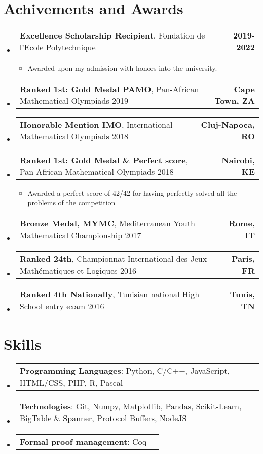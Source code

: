 \documentclass[letterpaper,11pt]{article}
\makeatletter
\newcommand{\resumeItem}[2]{
  \item\small{
    \textbf{#1}{#2 \vspace{-2pt}}
  }
}
\newcommand{\resumePoint}[2]{
  \item
    \begin{tabular*}{0.97\textwidth}[t]{l@{\extracolsep{\fill}}r}
      #1 & \textbf{\small #2}
    \end{tabular*}
}
\newcommand{\resumeSubHeadingListStart}{\begin{itemize}[leftmargin=*]}
\newcommand{\resumeSubHeadingListEnd}{\end{itemize}}
\newcommand{\resumeItemListStart}{\begin{itemize}}
\newcommand{\resumeItemListEnd}{\end{itemize}\vspace{-5pt}}
\makeatother
\begin{document}
\section{Achivements and Awards}
  \resumeSubHeadingListStart
    \resumePoint
      {\textbf{Excellence Scholarship Recipient}, Fondation de l'Ecole Polytechnique}{2019-2022}
      \vspace{-0.6cm}\resumeItemListStart
        \resumeItem{}{Awarded upon my admission with honors into the university.}
      \resumeItemListEnd
    \resumePoint
      {\textbf{Ranked 1st: Gold Medal PAMO}, Pan-African Mathematical Olympiads 2019}{Cape Town, ZA}
      \vspace{-0.6cm}\resumeItemListStart
      \resumeItemListEnd
   \resumePoint
      {\textbf{Honorable Mention IMO}, International Mathematical Olympiads 2018}{Cluj-Napoca, RO}
      \vspace{-0.6cm}\resumeItemListStart
      \resumeItemListEnd
    \resumePoint
      {\textbf{Ranked 1st: Gold Medal \& Perfect score}, Pan-African Mathematical Olympiads 2018}{Nairobi, KE}
      \vspace{-0.6cm}\resumeItemListStart
        \resumeItem{}{Awarded a perfect score of 42/42 for having perfectly solved all the problems of the competition}
      \resumeItemListEnd
    \resumePoint
      {\textbf{Bronze Medal, MYMC}, Mediterranean Youth Mathematical Championship 2017}{Rome, IT}
      \vspace{-0.6cm}\resumeItemListStart
      \resumeItemListEnd
    \resumePoint
      {\textbf{Ranked 24th}, Championnat International des Jeux Mathématiques et Logiques 2016}{Paris, FR}
      \vspace{-0.6cm}\resumeItemListStart
      \resumeItemListEnd
    \resumePoint
      {\textbf{Ranked 4th Nationally}, Tunisian national High School entry exam 2016}{Tunis, TN}
      \vspace{-0.6cm}\resumeItemListStart
      \resumeItemListEnd

  \resumeSubHeadingListEnd

 \section{Skills}
  \resumeSubHeadingListStart
    \resumePoint
     {\textbf{Programming Languages}: Python, C/C++, JavaScript, HTML/CSS, PHP, R, Pascal}{}
   \vspace*{-0.7cm}
    \resumePoint
     {\textbf{Technologies}: Git, Numpy, Matplotlib, Pandas, Scikit-Learn, BigTable \& Spanner, Protocol Buffers, NodeJS}{}
    \vspace*{-0.7cm}
    \resumePoint
     {\textbf{Formal proof management}: Coq}{}
  \resumeSubHeadingListEnd
\end{document}
